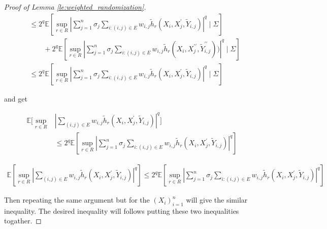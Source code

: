 \documentclass[letterpaper]{article} %
\def\DoubleColumn{}
\def\DoubleColumnEnd{}
\def\SingleColumn{}
\def\SingleColumnEnd{}
\newcommand{\E}{\mathbb{E}}
\newcommand{\pair}[1]{(#1)}
\begin{document}
\begin{proof}[Proof of Lemma \ref{le:weighted_randomization}]
\begin{align*}
    &\le 2^q\E[\sup_{r\in R}|\sum_{j=1}^n \sigma_j \sum_{i:\pair{i,j}\in E} w_{i,j}\tilde{h}_r(X_i,X_j^\prime,\tilde{Y}_{i,j})|^q\mid \Sigma]\\
    &\qquad+ 2^q\E[\sup_{r\in R}|\sum_{j=1}^n \sigma_j \sum_{i:\pair{i,j}\in E} w_{i,j}\tilde{h}_r(X_i,X_j^{\prime\prime},\tilde{Y}_{i,j}^{\prime\prime}))|^q\mid \Sigma]\\
    &\le 2^q\E[\sup_{r\in R}|\sum_{j=1}^n\sigma_j\sum_{i:\pair{i,j}\in E}w_{i,j} \tilde{h}_r(X_i,X_j^\prime,\tilde{Y}_{i,j})|^q\mid \Sigma]
\end{align*}
\SingleColumnEnd
and get
\DoubleColumn
\begin{align*}
    \E[\sup_{r\in R}&|\sum_{\pair{i,j}\in E} w_{i,j}\tilde{h}_r(X_i,X_j^\prime,\tilde{Y}_{i,j})|^q] \\
    &\le 2^q\E[\sup_{r\in R}|\sum_{j=1}^n\sigma_j\sum_{i:\pair{i,j}\in E}w_{i,j} \tilde{h}_r(X_i,X_j^\prime,\tilde{Y}_{i,j})|^q]
\end{align*}
\DoubleColumnEnd
\SingleColumn
\begin{align*}
    \E[\sup_{r\in R}|\sum_{\pair{i,j}\in E} w_{i,j}\tilde{h}_r(X_i,X_j^\prime,\tilde{Y}_{i,j})|^q] \le 2^q\E[\sup_{r\in R}|\sum_{j=1}^n\sigma_j\sum_{i:\pair{i,j}\in E}w_{i,j} \tilde{h}_r(X_i,X_j^\prime,\tilde{Y}_{i,j})|^q]
\end{align*}
\SingleColumnEnd
Then repeating the same argument but for the $(X_i)_{i=1}^n$ will give the similar inequality. The desired inequality will follows putting these two inequalities togather.
\end{proof}
\end{document}
